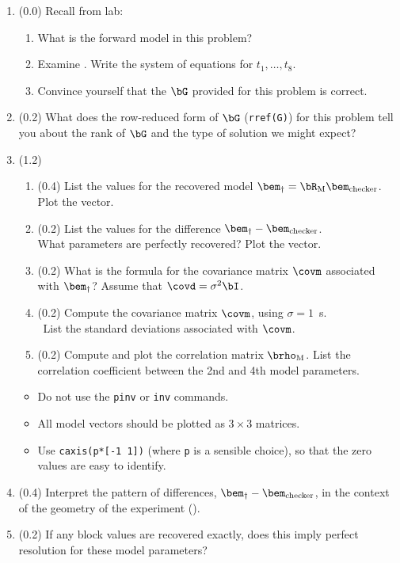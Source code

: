 \documentclass[11pt,titlepage,fleqn]{article}
\begin{document}

\begin{enumerate}

\item (0.0) Recall from lab:
%
\begin{enumerate}
\item What is the forward model in this problem?
\item Examine . Write the system of equations for $t_1, \ldots, t_8$.
\item Convince yourself that the $\bG$ provided for this problem is correct.
\end{enumerate}

\item (0.2) What does the row-reduced form of $\bG$ (\verb+rref(G)+) for this problem tell you about the rank of $\bG$ and the type of solution we might expect?

\item (1.2) 
\begin{enumerate}
\item (0.4) List the values for the recovered model $\bem_{\dagger} = \bR_{\rm M}\bem_{\rm checker}$. Plot the vector.
\item (0.2) List the values for the difference $\bem_{\dagger}-\bem_{\rm checker}$. \\
What parameters are perfectly recovered? Plot the vector.
\item (0.2) What is the formula for the covariance matrix $\covm$ associated with $\bem_{\dagger}$? Assume that $\covd = \sigma^2\bI$.
\item (0.2) Compute the covariance matrix $\covm$, using $\sigma = 1$~s. \\\
List the standard deviations associated with $\covm$.
\item (0.2) Compute and plot the correlation matrix $\brho_{\rm M}$. List the correlation coefficient between the 2nd and 4th model parameters.
\end{enumerate}

\begin{itemize}
\item Do not use the \verb+pinv+ or \verb+inv+ commands.
\item All model vectors should be plotted as $3 \times 3$ matrices.
\item Use \verb+caxis(p*[-1 1])+ (where \verb+p+ is a sensible choice), so that the zero values are easy to identify.
\end{itemize}

\item (0.4) Interpret the pattern of differences, $\bem_{\dagger}-\bem_{\rm checker}$, in the context of the geometry of the experiment ().

\item (0.2) If any block values are recovered exactly, does this imply perfect resolution for these model parameters?
\end{enumerate}
\end{document}
